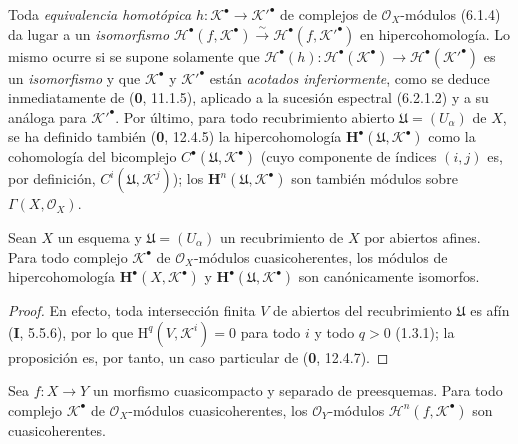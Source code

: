 \begin{env}[6.2.1]
Toda \emph{equivalencia homotópica} $h:\mathscr K^\bullet\to\mathscr K'^\bullet$ de complejos de
$\mathscr O_X$-módulos (6.1.4) da lugar a un \emph{isomorfismo}
$\mathscr H^\bullet(f,\mathscr K^\bullet)\xrightarrow{\sim}
\mathscr H^\bullet(f,\mathscr K'^\bullet)$ en hipercohomología. Lo mismo ocurre
si se supone solamente que
$\mathscr H^\bullet(h):\mathscr H^\bullet(\mathscr K^\bullet)\to
\mathscr H^\bullet(\mathscr K'^\bullet)$ es un \emph{isomorfismo} y que
$\mathscr K^\bullet$ y $\mathscr K'^\bullet$ están \emph{acotados inferiormente},
como se deduce inmediatamente de (\textbf 0, 11.1.5), aplicado a la sucesión espectral
(6.2.1.2) y a su análoga para $\mathscr K'^\bullet$. Por último, para todo
recubrimiento abierto $\mathfrak U=(U_\alpha)$ de $X$, se ha definido también
(\textbf 0, 12.4.5) la hipercohomología
$\mathbf H^\bullet(\mathfrak U,\mathscr K^\bullet)$ como la cohomología del
bicomplejo $C^\bullet(\mathfrak U,\mathscr K^\bullet)$ (cuyo componente de
índices $(i,j)$ es, por definición,
$C^i(\mathfrak U,\mathscr K^j)$); los
$\mathbf H^n(\mathfrak U,\mathscr K^\bullet)$ son también módulos sobre
$\Gamma(X,\mathscr O_X)$.
\end{env}

\begin{proposition}[6.2.2]
Sean $X$ un esquema y $\mathfrak U=(U_\alpha)$ un recubrimiento de $X$ por
abiertos afines. Para todo complejo $\mathscr K^\bullet$ de
$\mathscr O_X$-módulos cuasicoherentes, los módulos de hipercohomología
$\mathbf H^\bullet(X,\mathscr K^\bullet)$ y
$\mathbf H^\bullet(\mathfrak U,\mathscr K^\bullet)$ son canónicamente
isomorfos.
\end{proposition}

\begin{proof}
En efecto, toda intersección finita $V$ de abiertos del recubrimiento
$\mathfrak U$ es afín (\textbf I, 5.5.6), por lo que
$\mathrm H^q(V,\mathscr K^i)=0$ para todo $i$ y todo $q>0$ (1.3.1); la
proposición es, por tanto, un caso particular de (\textbf 0, 12.4.7).
\end{proof}

\begin{proposition}[6.2.3]
Sea $f:X\to Y$ un morfismo cuasicompacto y separado de preesquemas. Para todo
complejo $\mathscr K^\bullet$ de $\mathscr O_X$-módulos cuasicoherentes, los
$\mathscr O_Y$-módulos $\mathscr H^n(f,\mathscr K^\bullet)$ son
cuasicoherentes.
\end{proposition}

